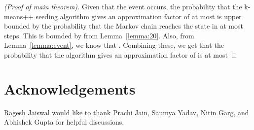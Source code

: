 \documentclass[11pt]{article}
\begin{document}
\begin{proof}[(Proof of main theorem)]
Given that the event  occurs, the probability that the k-means++ seeding algorithm gives an approximation factor of at most  is upper bounded by the probability that the Markov chain reaches the state  in at most  steps. 
This is bounded by  from Lemma~\ref{lemma:20}.
Also, from Lemma~\ref{lemma:event}, we know that .
Combining these, we get that the probability that the algorithm gives an approximation factor of  is at most 
\end{proof}

\section{Acknowledgements}
Ragesh Jaiswal would like to thank Prachi Jain, Saumya Yadav, Nitin Garg, and Abhishek Gupta for helpful discussions.



\end{document}

